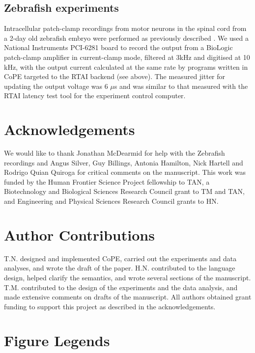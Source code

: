 \documentclass[11pt]{article}
\begin{document}
\subsection*{Zebrafish experiments}

Intracellular patch-clamp recordings from motor neurons in the spinal
cord from a 2-day old zebrafish embryo were performed as previously
described \cite{McDearmid2006}. We used a National Instruments PCI-6281
board to
record the output from a BioLogic patch-clamp amplifier in
current-clamp mode, filtered at 3kHz and digitised at 10 kHz, with the
output current calculated at the same rate by programs written in
CoPE targeted to the RTAI backend (see
above). The measured jitter for updating the output voltage was 6
$\mu$s and was similar to that measured with the RTAI latency test
tool for the experiment control computer.

\section*{Acknowledgements} 

We would like to thank Jonathan McDearmid for help with the Zebrafish
recordings and Angus Silver, Guy Billings, Antonia Hamilton, Nick
Hartell and Rodrigo Quian Quiroga for critical comments on the
manuscript. This work was funded by the Human Frontier Science Project
fellowship to TAN, a Biotechnology and Biological Sciences Research
Council grant to TM and TAN, and Engineering and Physical Sciences Research
Council grants to HN.

\section*{Author Contributions}  
T.N. designed and implemented CoPE, carried out the experiments and
data analyses, and wrote the draft of the paper. H.N. contributed to
the language design, helped clarify the semantics, and wrote several
sections of the manuscript. T.M. contributed to the design of the
experiments and the data analysis, and made extensive comments on
drafts of the manuscript. All authors obtained grant funding to
support this project as described in the acknowledgements.






\pagebreak

\section*{Figure Legends}
\end{document}
